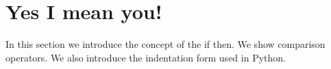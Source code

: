 \section{Yes I mean you!} \label{sec:MakingDecisions}

In this section we introduce the concept of the if then. We show comparison operators. We also introduce the indentation form used in Python.